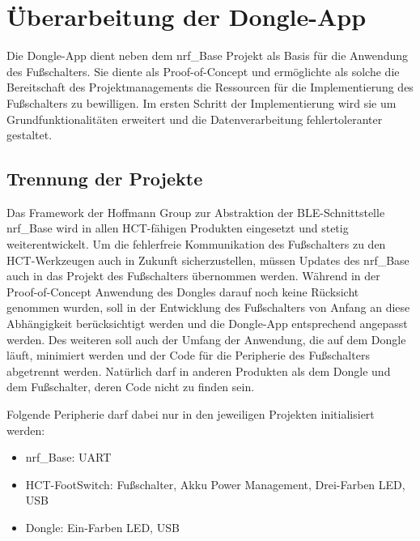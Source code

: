 \section{Überarbeitung der Dongle-App}
Die Dongle-App dient neben dem nrf\_Base Projekt als Basis für die Anwendung des Fußschalters. Sie diente als Proof-of-Concept und ermöglichte als solche die Bereitschaft des Projektmanagements die Ressourcen für die Implementierung des Fußschalters zu bewilligen. Im ersten Schritt der Implementierung wird sie um Grundfunktionalitäten erweitert und die Datenverarbeitung fehlertoleranter gestaltet.

\subsection{Trennung der Projekte}
Das Framework der Hoffmann Group zur Abstraktion der BLE-Schnittstelle nrf\_Base wird in allen HCT-fähigen Produkten eingesetzt und stetig weiterentwickelt. Um die fehlerfreie Kommunikation des Fußschalters zu den HCT-Werkzeugen auch in Zukunft sicherzustellen, müssen Updates des nrf\_Base auch in das Projekt des Fußschalters übernommen werden. Während in der Proof-of-Concept Anwendung des Dongles darauf noch keine Rücksicht genommen wurden, soll in der Entwicklung des Fußschalters von Anfang an diese Abhängigkeit berücksichtigt werden und die Dongle-App entsprechend angepasst werden. Des weiteren soll auch der Umfang der Anwendung, die auf dem Dongle läuft, minimiert werden und der Code für die Peripherie des Fußschalters abgetrennt werden. Natürlich darf in anderen Produkten als dem Dongle und dem Fußschalter, deren Code nicht zu finden sein.

Folgende Peripherie darf dabei nur in den jeweiligen Projekten initialisiert werden:
\begin{itemize}
	\item nrf\_Base: UART
	\item HCT-FootSwitch: Fußschalter, Akku Power Management, Drei-Farben LED, USB
	\item Dongle: Ein-Farben LED, USB
\end{itemize}

